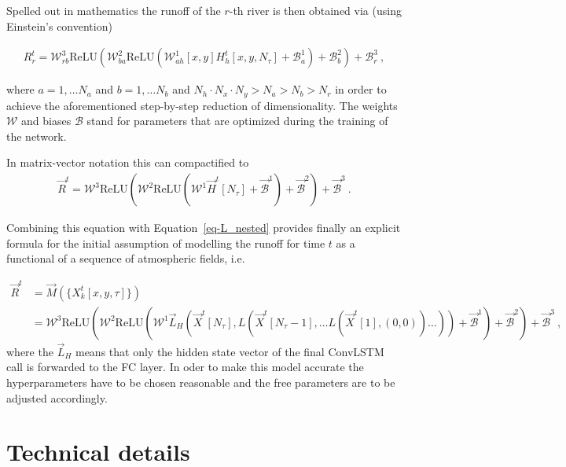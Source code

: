\documentclass[
]{agujournal2019}
\begin{document}
Spelled out in mathematics the runoff of the \(r\)-th river is then
obtained via (using Einstein's convention)

\[
\begin{aligned}
R_r^t = \mathcal{W}^{3}_{rb}\mathrm{ReLU}\left(\mathcal{W}^{2}_{ba}\mathrm{ReLU}\left(\mathcal{W}^{1}_{ah} [x,y] H^t_h[x,y, N_\tau] + \mathcal{B}^1_a\right) + \mathcal{B}^2_b \right) + \mathcal{B}^3_r \ ,
\end{aligned}
\]

where \(a=1,\ldots N_a\) and \(b=1,\ldots N_b\) and
\(N_h\cdot N_x\cdot N_y > N_a > N_b > N_r\) in order to achieve the
aforementioned step-by-step reduction of dimensionality. The weights
\(\mathcal{W}\) and biases \(\mathcal{B}\) stand for parameters that are
optimized during the training of the network.

In matrix-vector notation this can compactified to \[
\begin{aligned}
\vec{R}^t = \pmb{\mathcal{W}}^{3}\mathrm{ReLU}\left(\pmb{\mathcal{W}}^{2}\mathrm{ReLU}\left(\pmb{\mathcal{W}}^{1} \vec{H}^t[N_\tau] + \vec{\mathcal{B}}^1\right) + \vec{\mathcal{B}}^2 \right) + \vec{\mathcal{B}}^3 \ .
\end{aligned}
\]

Combining this equation with Equation~\ref{eq-L_nested} provides finally
an explicit formula for the initial assumption of modelling the runoff
for time \(t\) as a functional of a sequence of atmospheric fields, i.e.

\[
\begin{aligned}
\vec{R}^t & = \vec{M}(\{X^t_k[x,y,\tau]\}) \\
& = \pmb{\mathcal{W}}^{3}\mathrm{ReLU}\left(\pmb{\mathcal{W}}^{2}\mathrm{ReLU}\left(\pmb{\mathcal{W}}^{1} \vec{L}_H \left( \vec{X}^t[N_\tau], L \left( \vec{X}^t[N_\tau-1], \ldots L \left( \vec{X}^t[1], (0, 0) \right) \ldots \right) \right) + \vec{\mathcal{B}}^1\right) + \vec{\mathcal{B}}^2 \right) + \vec{\mathcal{B}}^3 \ ,
\end{aligned}
\] where the \(\vec{L}_H\) means that only the hidden state vector of
the final ConvLSTM call is forwarded to the FC layer. In oder to make
this model accurate the hyperparameters have to be chosen reasonable and
the free parameters are to be adjusted accordingly.

\section{Technical details}\label{technical-details}
\end{document}
